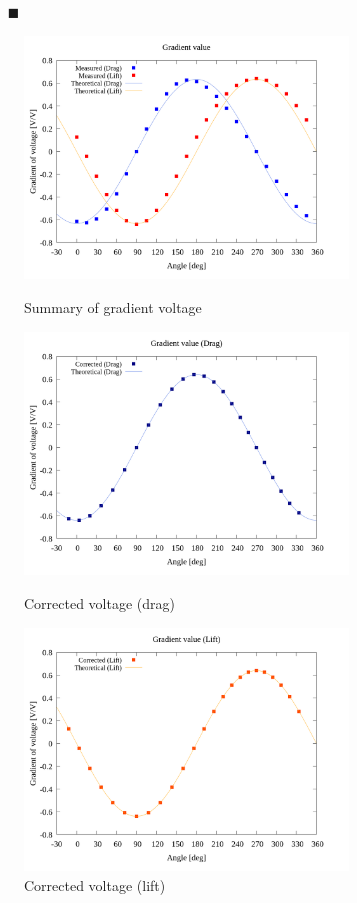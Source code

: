 \documentclass[twocolumn,a4j]{jsarticle}
\begin{document}
\newpage

\begin{itemize}
    \item [$\blacksquare$] 
\end{itemize}

\begin{figure}[htbp]
    \footnotesize
    \begin{center}
        \includegraphics[width=86mm]{../graphes/offset_x=5_y=0/20/20_adjust-value.png}
        \caption{Summary of gradient voltage}
        \includegraphics[width=86mm]{../graphes/offset_x=5_y=0/21/21-2_corrected_offset_drag.png}
        \caption{Corrected voltage (drag)}
        \includegraphics[width=86mm]{../graphes/offset_x=5_y=0/21/21-2_corrected_offset_lift.png}
        \caption{Corrected voltage (lift)}
    \end{center}
\end{figure}
\end{document}
